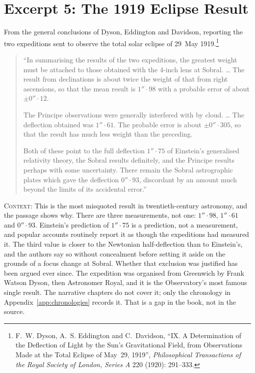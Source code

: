 \medskip

\section{Excerpt 5: The 1919 Eclipse Result}

From the general conclusions of Dyson, Eddington and Davidson, reporting the two expeditions sent to observe the total solar eclipse of 29~May 1919.\footnote{F.~W. Dyson, A.~S. Eddington and C.~Davidson, ``IX. A Determination of the Deflection of Light by the Sun's Gravitational Field, from Observations Made at the Total Eclipse of May~29, 1919'', \emph{Philosophical Transactions of the Royal Society of London, Series A} 220 (1920): 291--333.}

\begin{quote}
``In summarising the results of the two expeditions, the greatest weight must be attached to those obtained with the 4-inch lens at Sobral. \ldots{} The result from declinations is about twice the weight of that from right ascensions, so that the mean result is $1''\!\cdot\!98$ with a probable error of about $\pm 0''\!\cdot\!12$.

The Principe observations were generally interfered with by cloud. \ldots{} The deflection obtained was $1''\!\cdot\!61$. The probable error is about $\pm 0''\!\cdot\!305$, so that the result has much less weight than the preceding.

Both of these point to the full deflection $1''\!\cdot\!75$ of Einstein's generalised relativity theory, the Sobral results definitely, and the Principe results perhaps with some uncertainty. There remain the Sobral astrographic plates which gave the deflection $0''\!\cdot\!93$, discordant by an amount much beyond the limits of its accidental error.''
\end{quote}

\noindent\textsc{Context}: This is the most misquoted result in twentieth-century astronomy, and the passage shows why. There are three measurements, not one: $1''\!\cdot\!98$, $1''\!\cdot\!61$ and $0''\!\cdot\!93$. Einstein's prediction of $1''\!\cdot\!75$ is a prediction, not a measurement, and popular accounts routinely report it as though the expeditions had measured it. The third value is closer to the Newtonian half-deflection than to Einstein's, and the authors say so without concealment before setting it aside on the grounds of a focus change at Sobral. Whether that exclusion was justified has been argued ever since. The expedition was organised from Greenwich by Frank Watson Dyson, then Astronomer Royal, and it is the Observatory's most famous single result. The narrative chapters do not cover it; only the chronology in Appendix~\ref{app:chronologies} records it. That is a gap in the book, not in the source.

